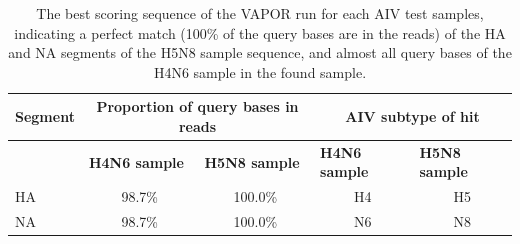 \setlength{\tabcolsep}{8pt}
\renewcommand{\arraystretch}{1.3}
\begin{table}[ht!]
    \centering
    \hspace*{-16pt}
    \begin{tabular}{@{}lcccc@{}}
    \toprule
    \multicolumn{1}{l}{\textbf{Segment}} & \multicolumn{2}{c}{\textbf{Proportion of query bases in reads}}                             & \multicolumn{2}{c}{\textbf{AIV subtype of hit}}                                         \\ \midrule
                                         & \multicolumn{1}{l}{\textbf{H4N6 sample}} & \multicolumn{1}{l}{\textbf{H5N8 sample}} & \multicolumn{1}{l}{\textbf{H4N6 sample}} & \multicolumn{1}{l}{\textbf{H5N8 sample}} \\ \cmidrule(l){2-5} 
    HA                                   & 98.7\%                                    & 100.0\%                                      & H4                                       & H5                                       \\
    NA                                   & 98.7\%                                    & 100.0\%                                      & N6                                       & N8                                       \\ \bottomrule
    \end{tabular}
    \caption[Results of VAPOR run with AIV test samples.]{The best scoring sequence of the VAPOR run for each AIV test samples, indicating a perfect match (100\% of the query bases are in the reads) of the HA and NA segments of the H5N8 sample sequence, and almost all query bases of the H4N6 sample in the found sample.}    
\label{tab:4-aiv-vapor}
\end{table}

